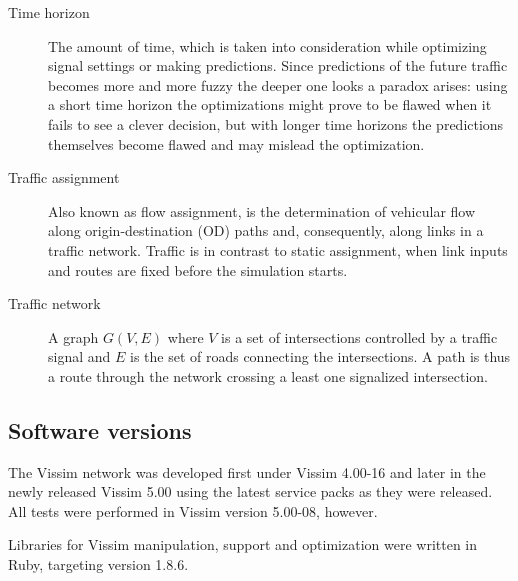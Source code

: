 \begin{description}
\item[Time horizon] The amount of time, which is taken into consideration while optimizing signal settings or making predictions. Since predictions of the future traffic becomes more and more fuzzy the deeper one looks a paradox arises: using a short time horizon the optimizations might prove to be flawed when it fails to see a clever decision, but with longer time horizons the predictions themselves become flawed and may mislead the optimization.

\item[Traffic assignment] Also known as flow assignment, is the determination of vehicular flow along origin-destination (OD) paths and, consequently, along links in a traffic network. Traffic is in contrast to static assignment, when link inputs and routes are fixed before the simulation starts.

\item[Traffic network] A graph $G(V,E)$ where $V$ is a set of intersections controlled by a traffic signal and $E$ is the set of roads connecting the intersections. A path is thus a route through the network crossing a least one signalized intersection.

\end{description}

\subsection{Software versions}
The Vissim network was developed first under Vissim 4.00-16 and later in the newly released Vissim 5.00 using the latest service packs as they were released. All tests were performed in Vissim version 5.00-08, however. 

Libraries for Vissim manipulation, support and optimization were written in Ruby, targeting version 1.8.6.
